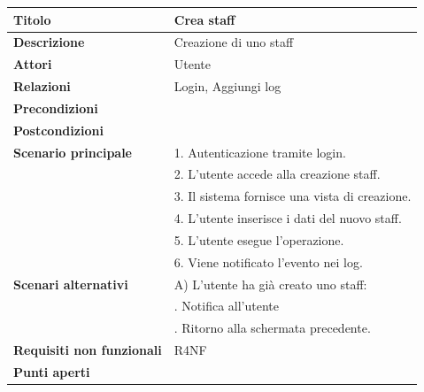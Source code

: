 \documentclass[a4paper]{article}
\begin{document}
\begin{table}[ht!]
  \begin{center}
    \begin{tabulary}{1\textwidth}{l|L}
        \textbf{Titolo} & Crea staff \\
        \hline
        \textbf{Descrizione} & Creazione di uno staff \\
        \hline
        \textbf{Attori} & Utente \\
        \hline
        \textbf{Relazioni} & Login, Aggiungi log \\
        \hline
        \textbf{Precondizioni} &  \\
        \hline
        \textbf{Postcondizioni} &  \\
        \hline
        \textbf{Scenario principale} & 1. Autenticazione tramite login. \\
                                     & 2. L'utente accede alla creazione staff. \\
                                     & 3. Il sistema fornisce una vista di creazione. \\
                                     & 4. L'utente inserisce i dati del nuovo staff. \\
                                     & 5. L'utente esegue l'operazione.\\
                                     & 6. Viene notificato l'evento nei log.\\
        \hline
        \textbf{Scenari alternativi} & A) L'utente ha già creato uno staff: \\
                                     & . Notifica all'utente \\
                                     & . Ritorno alla schermata precedente.\\
        \hline
        \textbf{Requisiti non funzionali} & R4NF \\
        \hline
        \textbf{Punti aperti} & \\
        \hline
    \end{tabulary}
  \end{center}
\end{table}

\end{document}
